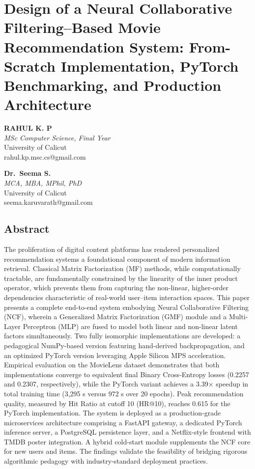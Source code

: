 \documentclass[
]{IEEEtran}
\author{}
\date{}
\begin{document}
\section{Design of a Neural Collaborative Filtering--Based Movie
Recommendation System: From-Scratch Implementation, PyTorch
Benchmarking, and Production
Architecture}\label{design-of-a-neural-collaborative-filteringbased-movie-recommendation-system-from-scratch-implementation-pytorch-benchmarking-and-production-architecture}

\textbf{RAHUL K. P}\\
\emph{MSc Computer Science, Final Year}\\
University of Calicut\\
rahul.kp.msc.cs@gmail.com

\textbf{Dr.~Seema S.}\\
\emph{MCA, MBA, MPhil, PhD}\\
University of Calicut\\
seema.karuvarath@gmail.com

\subsection{Abstract}\label{abstract}

The proliferation of digital content platforms has rendered personalized
recommendation systems a foundational component of modern information
retrieval. Classical Matrix Factorization (MF) methods, while
computationally tractable, are fundamentally constrained by the
linearity of the inner product operator, which prevents them from
capturing the non-linear, higher-order dependencies characteristic of
real-world user--item interaction spaces. This paper presents a complete
end-to-end system embodying Neural Collaborative Filtering (NCF),
wherein a Generalized Matrix Factorization (GMF) module and a
Multi-Layer Perceptron (MLP) are fused to model both linear and
non-linear latent factors simultaneously. Two fully isomorphic
implementations are developed: a pedagogical NumPy-based version
featuring hand-derived backpropagation, and an optimized PyTorch version
leveraging Apple Silicon MPS acceleration. Empirical evaluation on the
MovieLens dataset demonstrates that both implementations converge to
equivalent final Binary Cross-Entropy losses (0.2257 and 0.2307,
respectively), while the PyTorch variant achieves a 3.39× speedup in
total training time (3,295 s versus 972 s over 20 epochs). Peak
recommendation quality, measured by Hit Ratio at cutoff 10 (HR@10),
reaches 0.615 for the PyTorch implementation. The system is deployed as
a production-grade microservices architecture comprising a FastAPI
gateway, a dedicated PyTorch inference server, a PostgreSQL persistence
layer, and a Netflix-style frontend with TMDB poster integration. A
hybrid cold-start module supplements the NCF core for new users and
items. The findings validate the feasibility of bridging rigorous
algorithmic pedagogy with industry-standard deployment practices.
\end{document}
